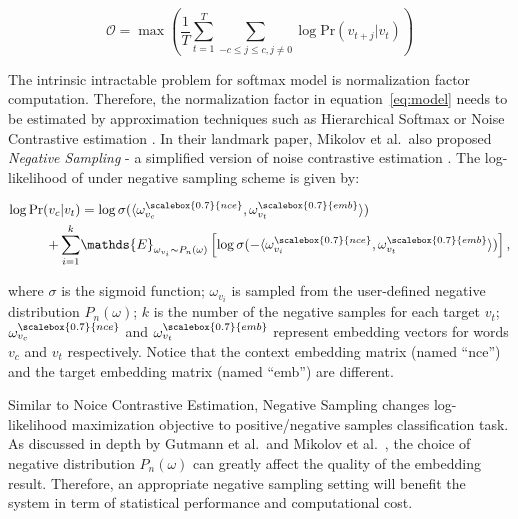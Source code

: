 \documentclass[letterpaper]{article}
\begin{document}
            \begin{equation}
                \label{eq:avgloglikelihood}
                \mathcal{O} = \max \left( \frac{1}{T} \sum_{t=1}^{T} \sum_{-c \leq j \leq c, j \neq 0} \log \mbox{Pr} (v_{t+j} | v_t) \right)
            \end{equation}

            The intrinsic intractable problem for softmax model is normalization factor computation. 
            Therefore, the normalization factor in equation~\ref{eq:model} needs to be estimated by 
            approximation techniques such as Hierarchical Softmax \cite{hs} or Noise Contrastive estimation
            \cite{nce}. In their landmark paper, Mikolov et al.\  also proposed \emph{Negative Sampling} - a 
            simplified version of noise contrastive estimation \cite{skipgram}. The log-likelihood of 
            under negative sampling scheme is given by:

            \begin{equation}
                \label{eq:objneg}
                \begin{aligned}
                \log \mbox{Pr} (v_c | v_t) & = \log \sigma( \langle \omega^{\scalebox{0.7}{nce}}_{v_c} , \omega^{\scalebox{0.7}{emb}}_{v_t} \rangle ) \\
                + \sum_{i=1}^{k} & \mathds{E}_{\omega_{v_i} \sim P_n(\omega)} \left[ \log \sigma( -\langle \omega^{\scalebox{0.7}{nce}}_{v_i} , \omega^{\scalebox{0.7}{emb}}_{v_t} \rangle) \right],
                \end{aligned}
            \end{equation}
            
            \noindent
            where $\sigma$ is the sigmoid function; $\omega_{v_i}$ is sampled from the user-defined
            negative distribution $P_n(\omega)$; $k$ is the number of the negative samples for each target
            $v_t$; $\omega^{\scalebox{0.7}{nce}}_{v_c}$ and $\omega^{\scalebox{0.7}{emb}}_{v_t}$ 
            represent embedding vectors for words $v_c$ and $v_t$ respectively. Notice that the
            context embedding matrix (named ``nce'') and the target embedding matrix (named ``emb'')
            are different.

            Similar to Noice Contrastive Estimation, Negative Sampling changes log-likelihood
            maximization objective to positive/negative samples classification task. As discussed
            in depth by Gutmann et al.\ and Mikolov et al.\ , the choice of negative distribution 
            $P_n(\omega)$ can greatly affect the quality of the embedding result. Therefore, an
            appropriate negative sampling setting will benefit the system in term of statistical
            performance and computational cost.
\end{document}
